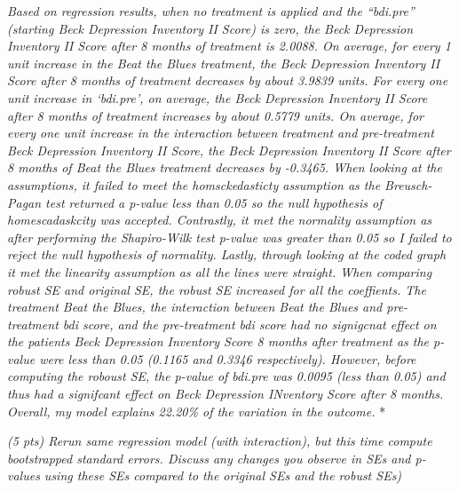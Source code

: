 \documentclass[
]{article}
\newenvironment{Shaded}{\begin{snugshade}}{\end{snugshade}}
\newcommand{\CommentTok}[1]{\textcolor[rgb]{0.56,0.35,0.01}{\textit{#1}}}
\newcommand{\DataTypeTok}[1]{\textcolor[rgb]{0.13,0.29,0.53}{#1}}
\newcommand{\DecValTok}[1]{\textcolor[rgb]{0.00,0.00,0.81}{#1}}
\newcommand{\FloatTok}[1]{\textcolor[rgb]{0.00,0.00,0.81}{#1}}
\newcommand{\KeywordTok}[1]{\textcolor[rgb]{0.13,0.29,0.53}{\textbf{#1}}}
\newcommand{\NormalTok}[1]{#1}
\newcommand{\OperatorTok}[1]{\textcolor[rgb]{0.81,0.36,0.00}{\textbf{#1}}}
\newcommand{\OtherTok}[1]{\textcolor[rgb]{0.56,0.35,0.01}{#1}}
\begin{document}
\emph{Based on regression results, when no treatment is applied and the
``bdi.pre'' (starting Beck Depression Inventory II Score) is zero, the
Beck Depression Inventory II Score after 8 months of treatment is
2.0088. On average, for every 1 unit increase in the Beat the Blues
treatment, the Beck Depression Inventory II Score after 8 months of
treatment decreases by about 3.9839 units. For every one unit increase
in `bdi.pre', on average, the Beck Depression Inventory II Score after 8
months of treatment increases by about 0.5779 units. On average, for
every one unit increase in the interaction between treatment and
pre-treatment Beck Depression Inventory II Score, the Beck Depression
Inventory II Score after 8 months of Beat the Blues treatment decreases
by -0.3465. When looking at the assumptions, it failed to meet the
homsckedasticty assumption as the Breusch-Pagan test returned a p-value
less than 0.05 so the null hypothesis of homescadaskcity was accepted.
Contrastly, it met the normality assumption as after performing the
Shapiro-Wilk test p-value was greater than 0.05 so I failed to reject
the null hypothesis of normality. Lastly, through looking at the coded
graph it met the linearity assumption as all the lines were straight.
When comparing robust SE and original SE, the robust SE increased for
all the coeffients. The treatment Beat the Blues, the interaction
between Beat the Blues and pre-treatment bdi score, and the
pre-treatment bdi score had no signigcnat effect on the patients Beck
Depression Inventory Score 8 months after treatment as the p-value were
less than 0.05 (0.1165 and 0.3346 respectively). However, before
computing the roboust SE, the p-value of bdi.pre was 0.0095 (less than
0.05) and thus had a signifcant effect on Beck Depression INventory
Score after 8 months. Overall, my model explains 22.20\% of the
variation in the outcome. } *

\emph{(5 pts) Rerun same regression model (with interaction), but this
time compute bootstrapped standard errors. Discuss any changes you
observe in SEs and p-values using these SEs compared to the original SEs
and the robust SEs)}

\begin{Shaded}
\end{Shaded}
\end{document}
